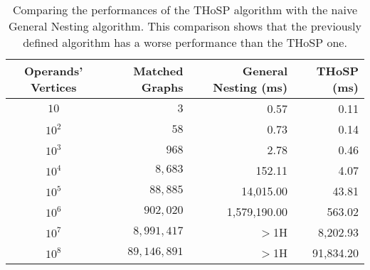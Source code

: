 \begin{table*}[!t]
	\centering
	\begin{tabular}{@{}cr|rr@{}}
		\toprule
		{\textbf{Operands' Vertices}} & Matched Graphs  & {\textbf{General Nesting} (ms)} & {\textbf{THoSP} (ms)}  \\	
		\midrule
		$10$ & $3$ &  0.57       & 0.11\\
		$10^2$ & $58$  & 0.73        & 0.14\\
		$10^3$  & $968$  & 2.78   & 0.46\\
		$10^4$ & $8,683$   & 152.11   & 4.07\\
		$10^5$ & $88,885$   & 14,015.00 & 43.81 \\
		$10^6$  & $902,020$  &  1,579,190.00      & 563.02\\
		$10^7$ & $8,991,417$   &  $>$1H      & 8,202.93\\
		$10^8$ & $89,146,891$   &  $>$1H      & 91,834.20\\
		\bottomrule
	\end{tabular}
	\caption{Comparing the performances of the THoSP algorithm with the naive General Nesting algorithm. This comparison shows that the previously defined algorithm has a worse performance than the THoSP one. }
	\label{tab:comparisonTwo}
\end{table*}



